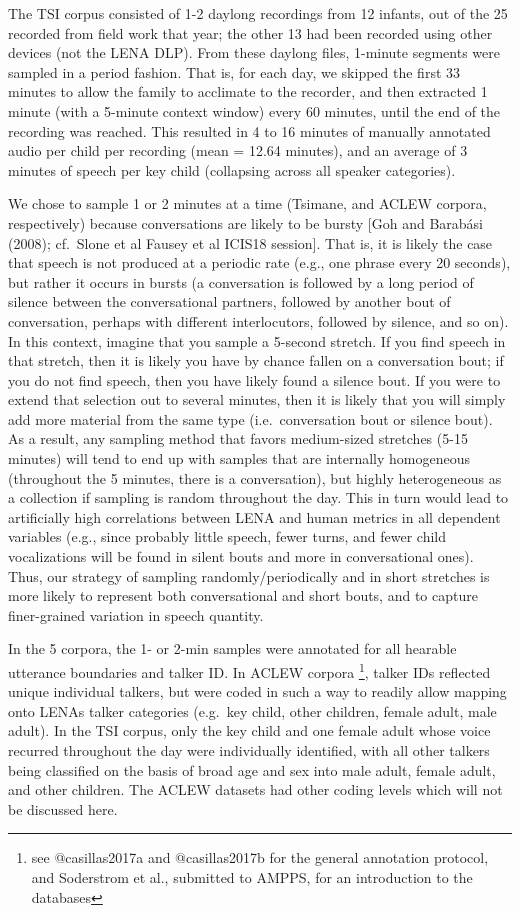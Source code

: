 \documentclass[english,floatsintext,man]{apa6}
\begin{document}
The TSI corpus consisted of 1-2 daylong recordings from 12 infants, out
of the 25 recorded from field work that year; the other 13 had been
recorded using other devices (not the LENA DLP). From these daylong
files, 1-minute segments were sampled in a period fashion. That is, for
each day, we skipped the first 33 minutes to allow the family to
acclimate to the recorder, and then extracted 1 minute (with a 5-minute
context window) every 60 minutes, until the end of the recording was
reached. This resulted in 4 to 16 minutes of manually annotated audio
per child per recording (mean = 12.64 minutes), and an average of 3
minutes of speech per key child (collapsing across all speaker
categories).

We chose to sample 1 or 2 minutes at a time (Tsimane, and ACLEW corpora,
respectively) because conversations are likely to be bursty {[}Goh and
Barabási (2008); cf.~Slone et al Fausey et al ICIS18 session{]}. That
is, it is likely the case that speech is not produced at a periodic rate
(e.g., one phrase every 20 seconds), but rather it occurs in bursts (a
conversation is followed by a long period of silence between the
conversational partners, followed by another bout of conversation,
perhaps with different interlocutors, followed by silence, and so on).
In this context, imagine that you sample a 5-second stretch. If you find
speech in that stretch, then it is likely you have by chance fallen on a
conversation bout; if you do not find speech, then you have likely found
a silence bout. If you were to extend that selection out to several
minutes, then it is likely that you will simply add more material from
the same type (i.e.~conversation bout or silence bout). As a result, any
sampling method that favors medium-sized stretches (5-15 minutes) will
tend to end up with samples that are internally homogeneous (throughout
the 5 minutes, there is a conversation), but highly heterogeneous as a
collection if sampling is random throughout the day. This in turn would
lead to artificially high correlations between LENA and human metrics in
all dependent variables (e.g., since probably little speech, fewer
turns, and fewer child vocalizations will be found in silent bouts and
more in conversational ones). Thus, our strategy of sampling
randomly/periodically and in short stretches is more likely to represent
both conversational and short bouts, and to capture finer-grained
variation in speech quantity.

In the 5 corpora, the 1- or 2-min samples were annotated for all
hearable utterance boundaries and talker ID. In ACLEW corpora
\footnote{see @casillas2017a and  @casillas2017b for the general annotation protocol, and Soderstrom et al., submitted to AMPPS, for an introduction to the databases},
talker IDs reflected unique individual talkers, but were coded in such a
way to readily allow mapping onto LENAs talker categories (e.g.~key
child, other children, female adult, male adult). In the TSI corpus,
only the key child and one female adult whose voice recurred throughout
the day were individually identified, with all other talkers being
classified on the basis of broad age and sex into male adult, female
adult, and other children. The ACLEW datasets had other coding levels
which will not be discussed here.
\end{document}
